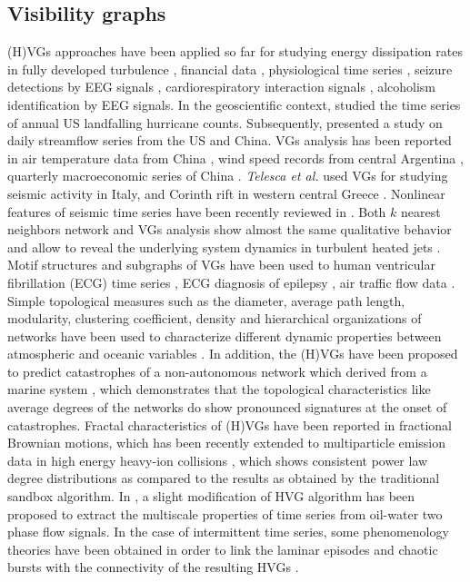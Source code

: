 	\subsection{Visibility graphs} \label{sec:appVGs}
	(H)VGs approaches have been applied so far for studying energy dissipation rates in fully developed turbulence \cite{Liu2010,Manshour2015,Manshour2015a}, financial data \cite{Ni2009,Yang2009,Qian2010}, physiological time series \cite{Lacasa2009,Shao2010,Dong2010,Ahmadlou2010,Jiang2013,Hou2014}, seizure detections by EEG signals \cite{Bhaduri2015,Liu2017a,Zhang2018}, cardiorespiratory interaction signals \cite{Long2014}, alcoholism identification by EEG signals\cite{Zhu2014}. In the geoscientific context, \cite{Elsner2009} studied the time series of annual US landfalling hurricane counts. Subsequently, \cite{Tang2010} presented a study on daily streamflow series from the US and China. VGs analysis has been reported in air temperature data from China \cite{Wang2009}, wind speed records from central Argentina \cite{Pierini2012}, quarterly macroeconomic series of China \cite{Wang2012}. {\emph{Telesca et al.}}\cite{Telesca2012} used VGs for studying seismic activity in Italy, and Corinth rift in western central Greece \cite{Hloupis2017}. Nonlinear features of seismic time series have been recently reviewed in \cite{Telesca2018b}. Both $k$ nearest neighbors network and VGs analysis show almost the same qualitative behavior and allow to reveal the underlying system dynamics in turbulent heated jets \cite{Charakopoulos2014}. Motif structures and subgraphs of VGs have been used to human ventricular fibrillation (ECG) time series \cite{Li2011,Li2012}, ECG diagnosis of epilepsy \cite{Tang2013},  air traffic flow data \cite{Liu2018}. Simple topological measures such as the diameter, average path length, modularity, clustering coefficient, density and hierarchical organizations of networks have been used to characterize different dynamic properties between atmospheric and oceanic variables \cite{CHARAKOPOULOS2018}. In addition, the (H)VGs have been proposed to predict catastrophes of a non-autonomous network which derived from a marine system \cite{Zhang2018b}, which demonstrates that the topological characteristics like average degrees of the networks do show pronounced signatures at the onset of catastrophes. Fractal characteristics of (H)VGs have been reported in fractional Brownian motions, which has been recently extended to multiparticle emission data in high energy heavy-ion collisions \cite{Mali2018}, which shows consistent power law degree distributions as compared to the results as obtained by the traditional sandbox algorithm. In \cite{Gao2016}, a slight modification of HVG algorithm has been proposed to extract the multiscale properties of time series from oil-water two phase flow signals. In the case of intermittent time series, some phenomenology theories have been obtained in order to link the laminar episodes and chaotic bursts with the connectivity of the resulting HVGs \cite{Nunez2013,Nunez2014}. 
	

